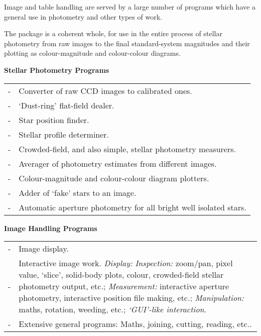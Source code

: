 Image and table handling are served by a large number of programs which have a
general use in photometry and other types of work.

The package is a coherent whole, for use in the entire process of stellar
photometry from raw images to the final standard-system magnitudes and
their plotting as colour-magnitude and colour-colour diagrams.


{\vspace*{1mm} \large \bf Stellar Photometry Programs \vspace*{-1mm} }

\hspace*{3ex} \begin{tabular}{lp{5.5in}}
- & Converter of raw CCD images to calibrated ones. \\
- & `Dust-ring' flat-field dealer. \\
- & Star position finder. \\
- & Stellar profile determiner. \\
- & Crowded-field, and also simple, stellar photometry measurers. \\
- & Averager of photometry estimates from different images. \\
- & Colour-magnitude and colour-colour diagram plotters. \\
- & Adder of `fake' stars to an image. \\
- & Automatic aperture photometry for all bright well isolated stars. \\
\end{tabular}

{\vspace*{1mm} \large \bf Image Handling Programs \vspace*{-1mm} }

\hspace*{3ex} \begin{tabular}{lp{5.5in}}
- & Image display. \\
- & Interactive image work. {\it Display:} {\it Inspection:}
    zoom/pan, pixel value, `slice', solid-body plots, colour,
    crowded-field stellar photometry output, etc.;
    {\it Measurement:} interactive aperture photometry, interactive
    position file making, etc.; {\it Manipulation:} maths, rotation,
    weeding, etc.; {\it `GUI'-like interaction}. \\
- & Extensive general programs: Maths, joining, cutting, reading, etc.. \\
\end{tabular}


